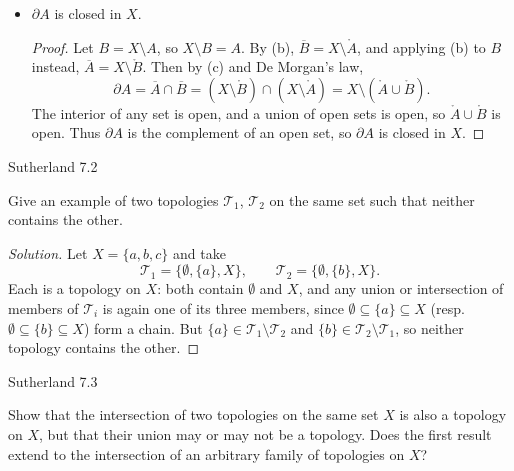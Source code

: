 \documentclass[minion]{homework}
\begin{document}
\begin{problems}
\begin{itemize}
\begin{proof}
    \end{proof}
  \item[(d)] $\partial A$ is closed in $X$. \newline
    \begin{proof}
      Let $B = X \setminus A$, so $X \setminus B = A$. By (b), $\overline{B} = X \setminus \mathring{A}$, and applying (b) to $B$ instead, $\overline{A} = X \setminus \mathring{B}$. Then by (c) and De Morgan's law,
      $$\partial A = \overline{A} \cap \overline{B} = (X \setminus \mathring{B}) \cap (X \setminus \mathring{A}) = X \setminus (\mathring{A} \cup \mathring{B}).$$
      The interior of any set is open, and a union of open sets is open, so $\mathring{A} \cup \mathring{B}$ is open. Thus $\partial A$ is the complement of an open set, so $\partial A$ is closed in $X$.
    \end{proof}
\end{itemize}

\problem Sutherland 7.2

Give an example of two topologies $\mathcal{T}_1$, $\mathcal{T}_2$ on the same set such that neither contains the other.

\begin{proof}[Solution]
  Let $X = \{a,b,c\}$ and take
  $$\mathcal{T}_1 = \{\emptyset, \{a\}, X\}, \qquad \mathcal{T}_2 = \{\emptyset, \{b\}, X\}.$$
  Each is a topology on $X$: both contain $\emptyset$ and $X$, and any union or intersection of members of $\mathcal{T}_i$ is again one of its three members, since $\emptyset \subseteq \{a\} \subseteq X$ (resp. $\emptyset \subseteq \{b\} \subseteq X$) form a chain. But $\{a\} \in \mathcal{T}_1 \setminus \mathcal{T}_2$ and $\{b\} \in \mathcal{T}_2 \setminus \mathcal{T}_1$, so neither topology contains the other.
\end{proof}

\problem Sutherland 7.3

Show that the intersection of two topologies on the same set $X$ is also a topology on $X$, but that their union may or may not be a topology. Does the first result extend to the intersection of an arbitrary family of topologies on $X$?


\end{problems}
\end{document}

